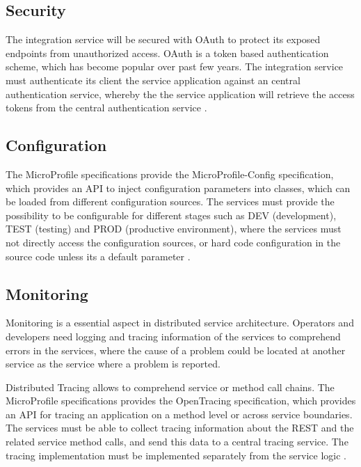 \subsection{Security}
\label{sec:esboc-requirements-service-security}
The integration service will be secured with OAuth to protect its exposed endpoints from unauthorized access. OAuth is a token based authentication scheme, which has become popular over past few years. The  integration service must authenticate its client the service application against an central authentication service, whereby the the service application will retrieve the access tokens from the central authentication service \cite{OAuth2018}.

\subsection{Configuration}
\label{sec:esboc-requirements-service-config}
The MicroProfile specifications provide the MicroProfile-Config specification, which provides an API to inject configuration parameters into classes, which can be loaded from different configuration sources. The services must provide the possibility to be configurable for different stages such as DEV (development), TEST (testing) and PROD (productive environment), where the services must not directly access the configuration sources, or hard code configuration in the source code unless its a default parameter \cite{EclipseMicroprofileConfig2018}.

\subsection{Monitoring}
\label{sec:esboc-requirements-service-monitoring}
Monitoring is a essential aspect in distributed service architecture. Operators and developers need logging and tracing information of the services to comprehend errors in the services, where the cause of a problem could be located at another service as the service where a problem is reported.

Distributed Tracing allows to comprehend service or method call chains. The MicroProfile specifications provides the OpenTracing specification, which provides an API for tracing an application on a method level or across service boundaries. The services must be able to collect tracing information about the REST and the related service method calls, and send this data to a central tracing service. The tracing implementation must be implemented separately from the service logic \cite{CNCFOpentracing2018}.

